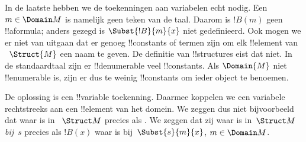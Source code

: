 \documentclass[../../../include/open-logic-section]{subfiles}
\begin{document}
\begin{explain}
In de laatste
 hebben we de toekenningen
aan variabelen echt nodig. Een $m \in \Domain M$ is namelijk geen teken
van de taal. Daarom is $!B(m)$ geen !!a{formula}; anders gezegd is
$\Subst{!B}{m}{x}$ niet gedefinieerd. Ook mogen we er niet van uitgaan
dat er genoeg !!{constant}s of termen zijn om elk !!{element} van
~$\Struct{M}$ een naam te geven. De definitie van !!{structure}s eist
dat niet. In de standaardtaal zijn er !!{denumerable} veel
!!{constant}s. Als $\Domain{M}$ niet !!{enumerable} is, zijn er dus te
weinig !!{constant}s om ieder object te benoemen.

De oplossing is een !!{variable} toekenning. Daarmee koppelen we een
variabele rechtstreeks aan een !!{element} van het domein. We zeggen
dus niet bijvoorbeeld dat
 waar is in
~$\Struct M$ precies als . We zeggen dat zij waar is in~$\Struct M$
\emph{bij}~$s$ precies als $!B(x)$ waar is bij~$\Subst{s}{m}{x}$,
 $m \in \Domain M$.
\end{explain}
\end{document}
